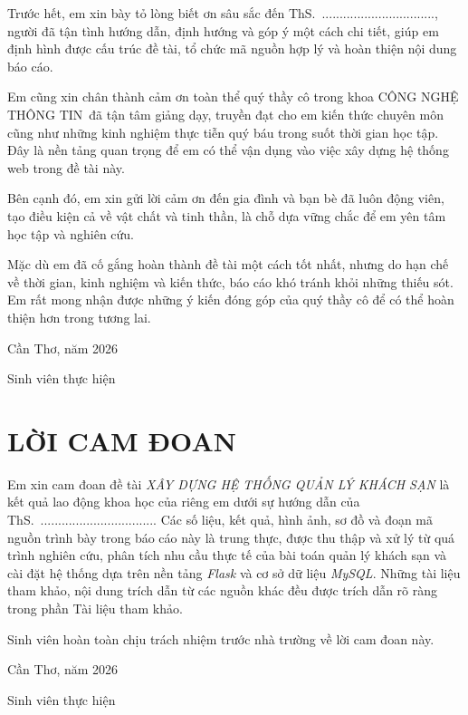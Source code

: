 \documentclass[13pt,a4paper]{extreport}
\newcommand{\TenDeTai}{XÂY DỰNG HỆ THỐNG QUẢN LÝ KHÁCH SẠN}
\newcommand{\Khoa}{CÔNG NGHỆ THÔNG TIN}
\newcommand{\GVHD}{ThS.\ ................................}
\begin{document}
Trước hết, em xin bày tỏ lòng biết ơn sâu sắc đến \GVHD, người đã tận tình hướng dẫn, định hướng và góp ý một cách chi tiết, giúp em định hình được cấu trúc đề tài, tổ chức mã nguồn hợp lý và hoàn thiện nội dung báo cáo.

Em cũng xin chân thành cảm ơn toàn thể quý thầy cô trong khoa \Khoa\ đã tận tâm giảng dạy, truyền đạt cho em kiến thức chuyên môn cũng như những kinh nghiệm thực tiễn quý báu trong suốt thời gian học tập. Đây là nền tảng quan trọng để em có thể vận dụng vào việc xây dựng hệ thống web trong đề tài này.

Bên cạnh đó, em xin gửi lời cảm ơn đến gia đình và bạn bè đã luôn động viên, tạo điều kiện cả về vật chất và tinh thần, là chỗ dựa vững chắc để em yên tâm học tập và nghiên cứu.

Mặc dù em đã cố gắng hoàn thành đề tài một cách tốt nhất, nhưng do hạn chế về thời gian, kinh nghiệm và kiến thức, báo cáo khó tránh khỏi những thiếu sót. Em rất mong nhận được những ý kiến đóng góp của quý thầy cô để có thể hoàn thiện hơn trong tương lai.

\vspace{1cm}
\hfill Cần Thơ, năm 2026

\hfill Sinh viên thực hiện

\chapter*{LỜI CAM ĐOAN}

Em xin cam đoan đề tài \emph{\TenDeTai} là kết quả lao động khoa học của riêng em dưới sự hướng dẫn của \GVHD. Các số liệu, kết quả, hình ảnh, sơ đồ và đoạn mã nguồn trình bày trong báo cáo này là trung thực, được thu thập và xử lý từ quá trình nghiên cứu, phân tích nhu cầu thực tế của bài toán quản lý khách sạn và cài đặt hệ thống dựa trên nền tảng \emph{Flask} và cơ sở dữ liệu \emph{MySQL}. Những tài liệu tham khảo, nội dung trích dẫn từ các nguồn khác đều được trích dẫn rõ ràng trong phần Tài liệu tham khảo.

Sinh viên hoàn toàn chịu trách nhiệm trước nhà trường về lời cam đoan này.

\vspace{1cm}
\hfill Cần Thơ, năm 2026

\hfill Sinh viên thực hiện

\end{document}
